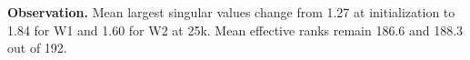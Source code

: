 \textbf{Observation.} Mean largest singular values change from 1.27 at initialization to 1.84 for W1 and 1.60 for W2 at 25k. Mean effective ranks remain 186.6 and 188.3 out of 192.
